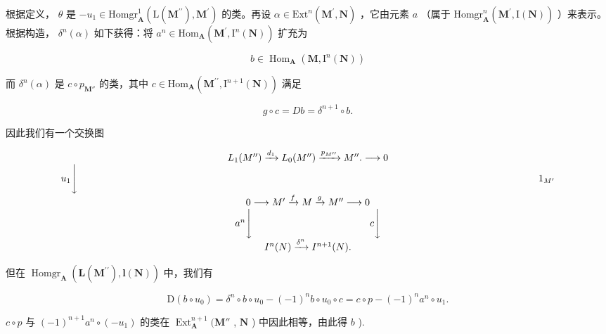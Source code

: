 根据定义， \(\theta\) 是 \(-u_{1}\in\mathrm{Homgr}_{\mathbf{A}}^{1}(\mathrm{L}(\mathbf{M}^{\prime\prime}),\mathbf{M}^{\prime})\) 的类。再设 \(\alpha\in\mathrm{Ext}^{n}(\mathbf{M}^{\prime},\mathbf{N})\) ，它由元素 \(a\) （属于 \(\mathrm{Homgr}_{\mathbf{A}}^{n}(\mathbf{M}^{\prime},\mathrm{I}(\mathbf{N}))\) ）来表示。根据构造， \(\delta^{n}(\alpha)\) 如下获得：将 \(a^{n}\in\mathrm{Hom}_{\mathbf{A}}(\mathbf{M}^{\prime},\mathrm{I}^{n}(\mathbf{N}))\) 扩充为

\[
b \in \operatorname{Hom} _ {\mathbf {A}} (\mathbf {M}, \mathrm{I} ^ {n} (\mathbf {N}))
\]

而 \(\delta^n (\alpha)\) 是 \(c\circ p_{\mathbf{M}''}\) 的类，其中 \(c\in \mathrm{Hom}_{\mathbf{A}}(\mathbf{M}^{\prime \prime},\mathrm{I}^{n + 1}(\mathbf{N}))\) 满足

\[
g \circ c = D b = \delta^ {n + 1} \circ b.
\]

因此我们有一个交换图

\[
\begin{array}{c} L _ {1} (M ^ {\prime \prime}) \xrightarrow {d _ {1}} L _ {0} (M ^ {\prime \prime}) \xrightarrow {p _ {M ^ {\prime \prime}}} M ^ {\prime \prime}. \longrightarrow 0 \\ u _ {1} \Biggl \downarrow \quad \quad \quad \quad \quad \quad \quad \quad \quad \quad \quad \quad \quad \quad \quad \quad \quad \quad \quad \quad \quad \quad \quad \quad \quad \quad \quad \quad \quad \quad \quad \quad \quad \quad \quad \quad \quad \quad \quad \quad \quad \quad \quad \quad \quad \quad \quad 1 _ {M ^ {\prime}} \\ 0 \longrightarrow M ^ {\prime} \xrightarrow {f} M \xrightarrow {g} M ^ {\prime \prime} \longrightarrow 0 \\ a ^ {n} \Biggl \downarrow \quad \quad \quad \quad \quad \quad \quad \quad \quad \quad \quad \quad c \Biggl \downarrow \\ I ^ {n} (N) \xrightarrow {\delta^ {n}} I ^ {n + 1} (N). \end{array}
\]

但在 \(\operatorname{Homgr}_{\mathbf{A}}(\mathbf{L}(\mathbf{M}^{\prime \prime}),\mathbf{l}(\mathbf{N}))\) 中，我们有

\[
\mathrm{D} (b \circ u _ {0}) = \delta^ {n} \circ b \circ u _ {0} - (- 1) ^ {n} b \circ u _ {0} \circ c = c \circ p - (- 1) ^ {n} a ^ {n} \circ u _ {1}.
\]

\(c \circ p\) 与 \((-1)^{n+1} a^n \circ (-u_1)\) 的类在 \(\operatorname{Ext}_{\mathbf{A}}^{n+1} (\mathbf{M}''\) , \(\mathbf{N}\) ) 中因此相等，由此得 \(b\) ).

